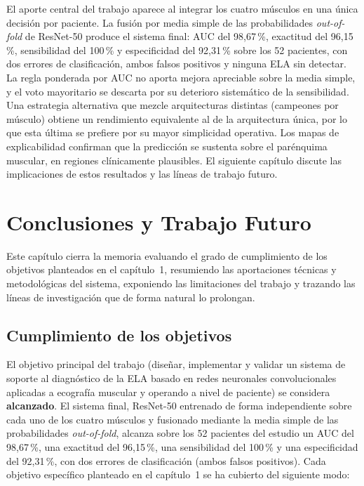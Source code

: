 \documentclass[12pt]{extarticle}
\numberwithin{equation}{section}
\begin{document}
\begin{refsection}
El aporte central del trabajo aparece al integrar los cuatro músculos en una única decisión por paciente. La fusión por media simple de las probabilidades \textit{out-of-fold} de ResNet-50 produce el sistema final: AUC del 98{,}67\,\%, exactitud del 96{,}15\,\%, sensibilidad del 100\,\% y especificidad del 92{,}31\,\% sobre los 52 pacientes, con dos errores de clasificación, ambos falsos positivos y ninguna ELA sin detectar. La regla ponderada por AUC no aporta mejora apreciable sobre la media simple, y el voto mayoritario se descarta por su deterioro sistemático de la sensibilidad. Una estrategia alternativa que mezcle arquitecturas distintas (campeones por músculo) obtiene un rendimiento equivalente al de la arquitectura única, por lo que esta última se prefiere por su mayor simplicidad operativa. Los mapas de explicabilidad confirman que la predicción se sustenta sobre el parénquima muscular, en regiones clínicamente plausibles. El siguiente capítulo discute las implicaciones de estos resultados y las líneas de trabajo futuro.

\newpage

\section{Conclusiones y Trabajo Futuro}\label{sec:conclusion}

Este capítulo cierra la memoria evaluando el grado de cumplimiento de los objetivos planteados en el capítulo~1, resumiendo las aportaciones técnicas y metodológicas del sistema, exponiendo las limitaciones del trabajo y trazando las líneas de investigación que de forma natural lo prolongan.

\subsection{Cumplimiento de los objetivos}\label{subsec:conc-objetivos}

El objetivo principal del trabajo (diseñar, implementar y validar un sistema de soporte al diagnóstico de la ELA basado en redes neuronales convolucionales aplicadas a ecografía muscular y operando a nivel de paciente) se considera \textbf{alcanzado}. El sistema final, ResNet-50 entrenado de forma independiente sobre cada uno de los cuatro músculos y fusionado mediante la media simple de las probabilidades \textit{out-of-fold}, alcanza sobre los 52 pacientes del estudio un AUC del 98{,}67\,\%, una exactitud del 96{,}15\,\%, una sensibilidad del 100\,\% y una especificidad del 92{,}31\,\%, con dos errores de clasificación (ambos falsos positivos). Cada objetivo específico planteado en el capítulo~1 se ha cubierto del siguiente modo:


\end{refsection}
\end{document}
